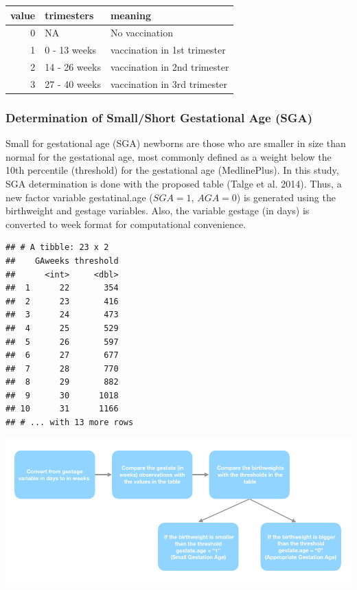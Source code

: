 \documentclass[
]{article}
\begin{document}
\begin{tabular}[t]{r|l|l}
\hline
value & trimesters & meaning\\
\hline
0 & NA & No vaccination\\
\hline
1 & 0 - 13 weeks & vaccination in 1st trimester\\
\hline
2 & 14 - 26 weeks & vaccination in 2nd trimester\\
\hline
3 & 27 - 40 weeks & vaccination in 3rd trimester\\
\hline
\end{tabular}

\hypertarget{determination-of-smallshort-gestational-age-sga}{%
\subsubsection{Determination of Small/Short Gestational Age
(SGA)}\label{determination-of-smallshort-gestational-age-sga}}

Small for gestational age (SGA) newborns are those who are smaller in
size than normal for the gestational age, most commonly defined as a
weight below the 10th percentile (threshold) for the gestational age
(MedlinePlus). In this study, SGA determination is done with the
proposed table (Talge et al. 2014). Thus, a new factor variable
gestatinal.age (\(SGA = 1\), \(AGA = 0\)) is generated using the
birthweight and gestage variables. Also, the variable gestage (in days)
is converted to week format for computational convenience.

\begin{verbatim}
## # A tibble: 23 x 2
##    GAweeks threshold
##      <int>     <dbl>
##  1      22       354
##  2      23       416
##  3      24       473
##  4      25       529
##  5      26       597
##  6      27       677
##  7      28       770
##  8      29       882
##  9      30      1018
## 10      31      1166
## # ... with 13 more rows
\end{verbatim}

\includegraphics[width=1\linewidth]{table1}
\end{document}
